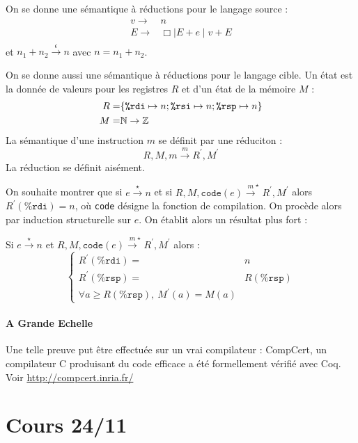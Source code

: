 \documentclass{cours}
\begin{document}
On se donne une sémantique à réductions pour le langage source : 
\[
    \begin{aligned}
        v \rightarrow& n\\
        E \rightarrow& \Box \mid E + e \mid v + E\\
    \end{aligned}    
\]
et $n_{1} + n_{2} \xrightarrow{\epsilon} n$ avec $n = n_{1} +n_{2}$.

On se donne aussi une sémantique à réductions pour le langage cible. Un état est la donnée de valeurs pour les registres $R$ et d'un état de la mémoire $M$ : 
\[
    \begin{aligned}
        R =& \{\texttt{\%rdi}\mapsto n; \texttt{\%rsi} \mapsto n; \texttt{\%rsp} \mapsto n\} \\
        M =& \mathbb{N} \rightarrow \mathbb{Z}
    \end{aligned}    
\]
La sémantique d'une instruction $m$ se définit par une réduciton : 
\[
    R, M, m \xrightarrow{m} R^{'}, M^{'}
\]
La réduction se définit aisément.

On souhaite montrer que si $e\xrightarrow{\star} n$ et si $R, M, \texttt{code}(e) \xrightarrow{m}^{\star} R^{'}, M^{'}$ alors $R^{'}(\texttt{\%rdi}) = n$, où \texttt{code} désigne la fonction de compilation. On procède alors par induction structurelle sur $e$.
On établit alors un résultat plus fort : 
\begin{proposition}
    Si $e\xrightarrow{\star} n$ et $R, M, \texttt{code}(e)\xrightarrow{m}^{\star} R^{'}, M^{'}$ alors : 
    \[
        \begin{cases}
            R^{'}(\texttt{\%rdi}) =& n\\
            R^{'}(\texttt{\%rsp}) =& R(\texttt{\%rsp})\\
            \forall a \geq R(\texttt{\%rsp}),\ M^{'}(a) = M(a)
        \end{cases}    
    \]
\end{proposition}

\subsection{A Grande Echelle}
Une telle preuve put être effectuée sur un vrai compilateur : CompCert, un compilateur C produisant du code efficace a été formellement vérifié avec Coq. Voir \url{http://compcert.inria.fr/}


\part[Compilation des Langages Fonctionnels]{Cours 24/11}
\end{document}
